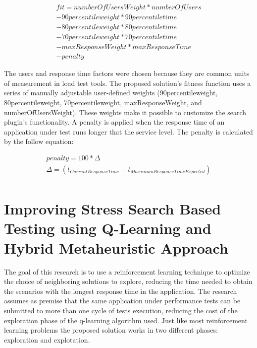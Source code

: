 \documentclass{bmcart}
\begin{document}
\begin{equation}
\begin{aligned}
fit=numberOfUsersWeight*numberOfUsers\\
-90percentileweight* 90percentiletime\\
-80percentileweight*80percentiletime\\
-70percentileweight*70percentiletime\\
-maxResponseWeight*maxResponseTime\\
-penalty
\end{aligned}
\end{equation}

The users and response time factors were chosen because they are common units of measurement in load test tools. The proposed solution's fitness function uses a series of manually adjustable user-defined weights (90percentileweight, 80percentileweight,  70percentileweight, maxResponseWeight, and numberOfUsersWeight). These weights make it possible to customize the search plugin's functionality. A penalty is applied when the response time of an application under test runs longer that the service level. The penalty is calculated by the follow equation:

\begin{equation}
\begin{aligned}
penalty=100 * \Delta \\
\Delta=(t_{Current Response Time} - t_{Maximum Response Time Expected})\\
\end{aligned}
\end{equation}



\section{Improving Stress Search Based Testing using Q-Learning and Hybrid Metaheuristic Approach}


The goal of this research is to use a reinforcement learning technique to optimize the choice of neighboring solutions to explore, reducing the time needed to obtain the scenarios with the longest response time in the application. The research assumes as premise that the same application under performance tests can be submitted to more than one cycle of tests execution, reducing the cost of the exploration phase of the q-learning algorithm used. Just like most reinforcement learning problems the proposed solution works in two different phases: exploration and explotation. 
\end{document}
